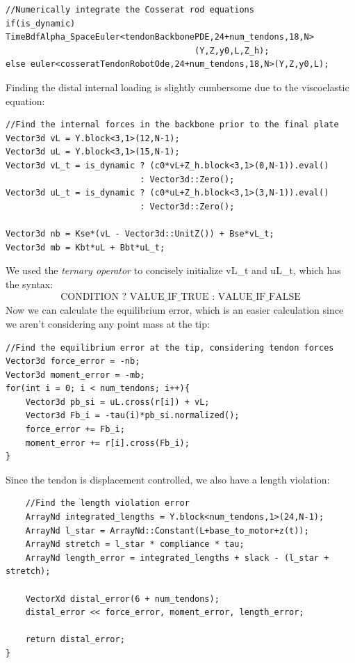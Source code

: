 \documentclass[12pt]{article}
\begin{document}
\begin{lstlisting}
//Numerically integrate the Cosserat rod equations
if(is_dynamic) TimeBdfAlpha_SpaceEuler<tendonBackbonePDE,24+num_tendons,18,N>
                                      (Y,Z,y0,L,Z_h);
else euler<cosseratTendonRobotOde,24+num_tendons,18,N>(Y,Z,y0,L);
\end{lstlisting}
Finding the distal internal loading is slightly cumbersome due to the viscoelastic equation:
\begin{lstlisting}
//Find the internal forces in the backbone prior to the final plate
Vector3d vL = Y.block<3,1>(12,N-1);
Vector3d uL = Y.block<3,1>(15,N-1);
Vector3d vL_t = is_dynamic ? (c0*vL+Z_h.block<3,1>(0,N-1)).eval()
                           : Vector3d::Zero();
Vector3d uL_t = is_dynamic ? (c0*uL+Z_h.block<3,1>(3,N-1)).eval()
                           : Vector3d::Zero();

Vector3d nb = Kse*(vL - Vector3d::UnitZ()) + Bse*vL_t;
Vector3d mb = Kbt*uL + Bbt*uL_t;
\end{lstlisting}
We used the \emph{ternary operator} to concisely initialize vL\_t and uL\_t, which has the syntax:
\begin{align*}
\text{CONDITION ? VALUE\_IF\_TRUE : VALUE\_IF\_FALSE}
\end{align*}
Now we can calculate the equilibrium error, which is an easier calculation since we aren't considering any point mass at the tip:
\begin{lstlisting}
//Find the equilibrium error at the tip, considering tendon forces
Vector3d force_error = -nb;
Vector3d moment_error = -mb;
for(int i = 0; i < num_tendons; i++){
    Vector3d pb_si = uL.cross(r[i]) + vL;
    Vector3d Fb_i = -tau(i)*pb_si.normalized();
    force_error += Fb_i;
    moment_error += r[i].cross(Fb_i);
}
\end{lstlisting}
Since the tendon is displacement controlled, we also have a length violation:
\newpage
\begin{lstlisting}
    //Find the length violation error
    ArrayNd integrated_lengths = Y.block<num_tendons,1>(24,N-1);
    ArrayNd l_star = ArrayNd::Constant(L+base_to_motor+z(t));
    ArrayNd stretch = l_star * compliance * tau;
    ArrayNd length_error = integrated_lengths + slack - (l_star + stretch);

    VectorXd distal_error(6 + num_tendons);
    distal_error << force_error, moment_error, length_error;

    return distal_error;
}
\end{lstlisting}
\end{document}
